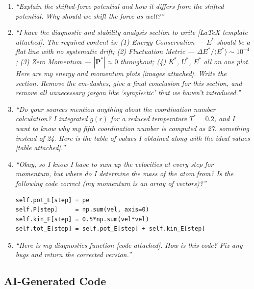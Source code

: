 \begin{enumerate}
    \item \textit{``Explain the shifted-force potential and how it differs from the shifted potential.
    Why should we shift the force as well?''}
 
    \item \textit{``I have the diagnostic and stability analysis section to write [LaTeX template
    attached]. The required content is: (1) Energy Conservation --- $E^*$ should be a flat line
    with no systematic drift; (2) Fluctuation Metric --- $\Delta E^*/\langle E^*\rangle \sim
    10^{-4}$; (3) Zero Momentum --- $|\mathbf{P}^*| \approx 0$ throughout; (4) $K^*$, $U^*$,
    $E^*$ all on one plot. Here are my energy and momentum plots [images attached]. Write the
    section. Remove the em-dashes, give a final conclusion for this section, and remove all
    unnecessary jargon like `symplectic' that we haven't introduced.''}
 
    \item \textit{``Do your sources mention anything about the coordination number calculation?
    I integrated $g(r)$ for a reduced temperature $T^* = 0.2$, and I want to know why my fifth
    coordination number is computed as 27. something instead of 24. Here is the table of values I
    obtained along with the ideal values [table attached].''}
 
    \item \textit{``Okay, so I know I have to sum up the velocities at every step for momentum,
but where do I determine the mass of the atom from? Is the following code correct (my
momentum is an array of vectors)?''}

\begin{verbatim}
self.pot_E[step] = pe
self.P[step]     = np.sum(vel, axis=0)
self.kin_E[step] = 0.5*np.sum(vel*vel)
self.tot_E[step] = self.pot_E[step] + self.kin_E[step]
\end{verbatim}
 
    \item \textit{``Here is my diagnostics function [code attached]. How is this code? Fix any
    bugs and return the corrected version.''}
      
\end{enumerate}

\subsection{AI-Generated Code}

